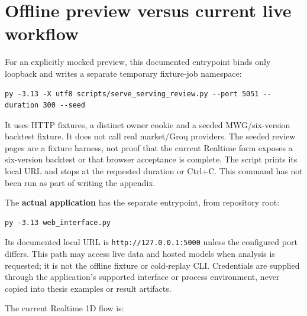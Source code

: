 \section{Offline preview versus current live workflow}\label{s:cc9510fc96476c9d}

For an explicitly mocked preview, this documented entrypoint binds only
loopback and writes a separate temporary fixture-job namespace:

\begin{Verbatim}[fontsize=\small,breaklines=true,breakanywhere=true]
py -3.13 -X utf8 scripts/serve_serving_review.py --port 5051 --duration 300 --seed
\end{Verbatim}

It uses HTTP fixtures, a distinct owner cookie and a seeded MWG/six-version
backtest fixture. It does not call real market/Groq providers. The seeded
review pages are a fixture harness, not proof that the current Realtime
form exposes a six-version backtest or that browser acceptance is complete.
The script prints its local URL and stops at the requested duration or
Ctrl+C. This command has not been run as part of writing the appendix.

The \textbf{actual application} has the separate entrypoint, from repository root:

\begin{Verbatim}[fontsize=\small,breaklines=true,breakanywhere=true]
py -3.13 web_interface.py
\end{Verbatim}

Its documented local URL is \texttt{http:\allowbreak{}/\allowbreak{}/\allowbreak{}127.\allowbreak{}0.\allowbreak{}0.\allowbreak{}1:\allowbreak{}5000} unless the configured
port differs. This path may access live data and hosted models when
analysis is requested; it is not the offline fixture or cold-replay CLI.
Credentials are supplied through the application's supported interface or
process environment, never copied into thesis examples or result artifacts.

The current Realtime 1D flow is:

